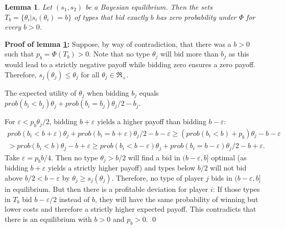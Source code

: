 \documentclass[a4paper,11pt]{article}
\newtheorem{lemma}{Lemma}
\begin{document}
\begin{lemma}\label{lem:2plAllPayNo Atom}
  Let $(s_1,s_2)$ be a Bayesian equilibrium. Then the sets $T_b=\{\theta _i| s_i(\theta _i)=b\}$ of types that bid exactly $b$ has zero probability under $\Phi$ for every $b>0$.
\end{lemma}
\textbf{Proof of lemma \ref{lem:2plAllPayNo Atom}:} Suppose, by way of contradiction, that there was a $b>0$ such that $p_b=\Phi(T_b)>0$. %
Note that no type $\theta _j$ will bid more than $b_j$ as this would lead to a strictly negative payoff while bidding zero ensures a zero payoff. Therefore, $s_j(\theta _j)\leq \theta_j$ for all $\theta _j\in\Re_+$.

The expected utility of $\theta _j$ when bidding $b_j$ equals $prob(b_i<b_j)\theta _j+prob(b_i=b_j)\theta _j/2-b_j$.

For  $\varepsilon <p_b\theta _j/2$, bidding $b+\varepsilon $ yields a higher payoff than bidding $b-\varepsilon $:
\begin{multline*}
 prob(b_i<b+\varepsilon )\theta _j+prob(b_i=b+\varepsilon )\theta _j/2-b-\varepsilon\geq (prob(b_i<b)+p_b)\theta _j-b-\varepsilon\\ >prob(b_i<b)\theta _j-b+\varepsilon\geq prob(b_i<b-\varepsilon )\theta _j+prob(b_i=b-\varepsilon )\theta _j/2-b+\varepsilon.
\end{multline*}
 Take $\varepsilon =p_bb/4$. Then no type $\theta _j> b/2$ will find a bid in  $(b-\varepsilon ,b]$ optimal (as bidding $b+\varepsilon $ yields a strictly higher payoff) and types below $b/2$ will not bid above $b/2<b-\varepsilon $ by $\theta _j\geq s_j(\theta _j)$. Therefore, no type of player $j$ bids in  $(b-\varepsilon ,b]$ in equilibrium. But then there is a profitable deviation for player $i$: If those types in $T_b$ bid $b-\varepsilon /2$ instead of $b$, they will have the same probability of winning but lower costs and therefore a strictly higher expected payoff. This contradicts that there is an equilibrium with $b>0$ and $p_b>0$.
 \qed 
\end{document}
